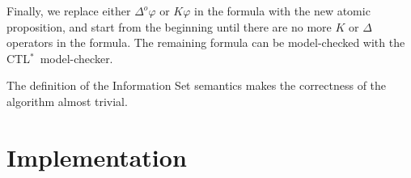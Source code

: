 \documentclass{acmart}
\def\ctls{CTL$^{*}$}
\def\K{\mathit{K}}
\def\D#1{\Delta^{#1}}
\begin{document}
Finally, we replace either $\D{o}\varphi$ or $\K\varphi$ in the formula with the new atomic proposition, and start from the beginning until there are no more $\K$ or $\Delta$ operators in the formula. The remaining formula can be model-checked with the \ctls\ model-checker.

The definition of the Information Set semantics makes the correctness of the algorithm almost trivial.

\section{Implementation}
\end{document}
